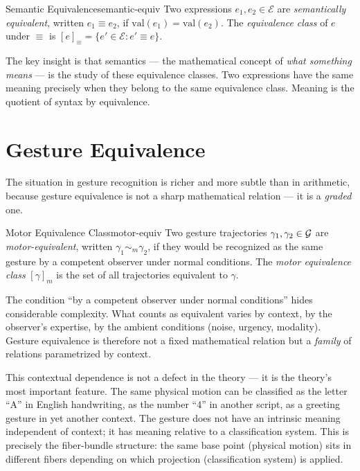 \begin{definition}{Semantic Equivalence}{semantic-equiv}
  Two expressions $e_1, e_2 \in \mathcal{E}$ are \emph{semantically
  equivalent}, written $e_1 \equiv e_2$, if
  $\mathrm{val}(e_1) = \mathrm{val}(e_2)$.
  The \emph{equivalence class} of $e$ under $\equiv$ is
  $[e]_\equiv = \{e' \in \mathcal{E} : e' \equiv e\}$.
\end{definition}

The key insight is that semantics — the mathematical concept of
\emph{what something means} — is the study of these equivalence classes.
Two expressions have the same meaning precisely when they belong to
the same equivalence class. Meaning is the quotient of syntax by
equivalence.

\section{Gesture Equivalence}

The situation in gesture recognition is richer and more subtle than in
arithmetic, because gesture equivalence is not a sharp mathematical
relation — it is a \emph{graded} one.

\begin{definition}{Motor Equivalence Class}{motor-equiv}
  Two gesture trajectories $\gamma_1, \gamma_2 \in \mathcal{G}$ are
  \emph{motor-equivalent}, written $\gamma_1 \sim_m \gamma_2$, if
  they would be recognized as the same gesture by a competent observer
  under normal conditions. The \emph{motor equivalence class}
  $[\gamma]_m$ is the set of all trajectories equivalent to $\gamma$.
\end{definition}

The condition ``by a competent observer under normal conditions'' hides
considerable complexity. What counts as equivalent varies by context,
by the observer's expertise, by the ambient conditions (noise,
urgency, modality). Gesture equivalence is therefore not a fixed
mathematical relation but a \emph{family} of relations parametrized
by context.

\begin{remark}
  This contextual dependence is not a defect in the theory — it is
  the theory's most important feature. The same physical motion can
  be classified as the letter ``A'' in English handwriting, as the
  number ``4'' in another script, as a greeting gesture in yet another
  context. The gesture does not have an intrinsic meaning independent
  of context; it has meaning relative to a classification system.
  This is precisely the fiber-bundle structure: the same base point
  (physical motion) sits in different fibers depending on which
  projection (classification system) is applied.
\end{remark}

